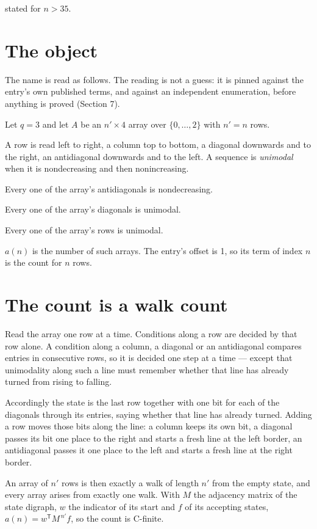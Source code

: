 \documentclass[11pt]{article}
\theoremstyle{definition}
\begin{document}
stated for $n > 35$.

\section{The object}

The name is read as follows. The reading is not a guess: it is pinned against the entry's own published terms, and against an independent enumeration, before anything is proved (Section 7).

Let $q = 3$ and let $A$ be an $n' \times 4$ array over $\{0,\dots,2\}$ with $n' = n$ rows.

A row is read left to right, a column top to bottom, a diagonal downwards and to the right, an antidiagonal downwards and to the left. A sequence is {\itshape unimodal} when it is nondecreasing and then nonincreasing.

Every one of the array's antidiagonals is nondecreasing.

Every one of the array's diagonals is unimodal.

Every one of the array's rows is unimodal.

$a(n)$ is the number of such arrays. The entry's offset is 1, so its term of index $n$ is the count for $n$ rows.

\section{The count is a walk count}

Read the array one row at a time. Conditions along a row are decided by that row alone. A condition along a column, a diagonal or an antidiagonal compares entries in consecutive rows, so it is decided one step at a time --- except that unimodality along such a line must remember whether that line has already turned from rising to falling.

Accordingly the state is the last row together with one bit for each of the diagonals through its entries, saying whether that line has already turned. Adding a row moves those bits along the line: a column keeps its own bit, a diagonal passes its bit one place to the right and starts a fresh line at the left border, an antidiagonal passes it one place to the left and starts a fresh line at the right border.

An array of $n'$ rows is then exactly a walk of length $n'$ from the empty state, and every array arises from exactly one walk. With $M$ the adjacency matrix of the state digraph, $w$ the indicator of its start and $f$ of its accepting states, $a(n) = w^{\mathsf T}M^{\,n'}f$, so the count is C-finite.
\end{document}
